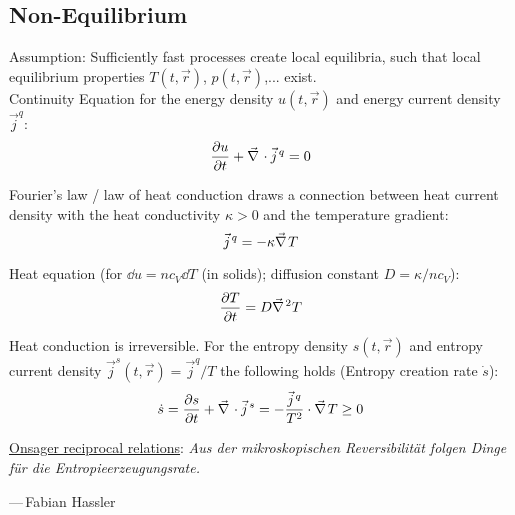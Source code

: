 	\subsection{Non-Equilibrium}
		\noindent
		Assumption: Sufficiently fast processes create local equilibria, such that local equilibrium properties $T(t,\vec{r})$, $p(t,\vec{r})$,... exist. \\
		Continuity Equation for the energy density $u(t,\vec{r})$ and energy current density $\vec{j}^q$:
		\begin{equation}
			\pdv{u}{t} + \Nabla\cdot\vec{j}^q = 0
		\end{equation}

		\noindent
		Fourier's law / law of heat conduction draws a connection between heat current density with the heat conductivity $\kappa >0$ and the temperature gradient:
		\begin{equation}
			\vec{j}^q = -\kappa \Nabla T
		\end{equation}

		\noindent
		Heat equation (for $\dd u = nc_V \dd T$ (\eg in solids); diffusion constant $D=\kappa/nc_V$):
		\begin{equation}
			\pdv{T}{t} = D\Nabla^2 T
		\end{equation}

		\noindent
		Heat conduction is irreversible. For the entropy density $s(t,\vec{r})$ and entropy current density $\vec{j}^s (t,\vec{r}) = \vec{j}^q/T$ the following holds (Entropy creation rate $\dot{s}$):
		\begin{equation}
			\dot{s} = \pdv{s}{t} + \Nabla\cdot\vec{j}^s = - \frac{\vec{j}^q}{T^2}\cdot\Nabla T \ge 0
		\end{equation}

		\noindent
		\href{https://en.wikipedia.org/wiki/Onsager_reciprocal_relations}{Onsager reciprocal relations}:
		\newline\indent\emph{Aus der mikroskopischen Reversibilität folgen Dinge für die Entropieerzeugungsrate.} %
		
		\hfill ---\,Fabian Hassler\vsp 


